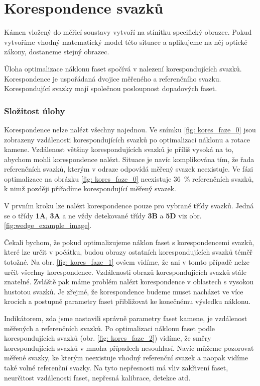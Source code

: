 \part{Korespondence svazků}

Kámen vložený do měřicí soustavy vytvoří na stínítku specifický obrazec. Pokud vytvoříme vhodný matematický model této situace a aplikujeme na něj optické zákony, dostaneme stejný obrazec. 

Úloha optimalizace náklonu faset spočívá v nalezení korespondujících svazků. Korespondence je uspořádaná dvojice měřeného a referenčního svazku. Korespondující svazky mají společnou posloupnost dopadových faset. 

\section{Složitost úlohy}
	Korespondence nelze nalézt všechny najednou. Ve snímku \ref{fig: kores_faze_0} jsou zobrazeny vzdálenosti korespondujících svazků po optimalizaci náklonu a rotace kamene. Vzdálenost většiny korespondujících svazků je příliš vysoká na to, abychom mohli korespondence nalézt. Situace je navíc komplikována tím, že řada referenčních svazků, kterým v odraze odpovídá měřený svazek neexistuje. Ve fázi optimalizace na obrázku \ref{fig: kores_faze_0} neexistuje \SI{36}{\percent} referenčních svazků, k nimž později přiřadíme korespondující měřený svazek. 
	
	  V prvním kroku lze nalézt korespondence pouze pro vybrané třídy svazků. Jedná se o třídy \textbf{1A}, \textbf{3A} a ne vždy detekované třídy \textbf{3B} a \textbf{5D} viz obr. \ref{fig:wedge_example_image}. 
	
	Čekali bychom, že pokud optimalizujeme náklon faset s korespondencemi svazků, které lze určit v počátku, budou obrazy ostatních korespondujících svazků téměř totožné. Na obr. \ref{fig: kores_faze_1} ovšem vidíme, že ani v tomto případě nelze určit všechny korespondence. Vzdálenosti obrazů korespondujících svazků stále znatelné. Zvláště pak máme problém nalézt korespondence v oblastech s vysokou hustotou svazků. Je zřejmé, že korespondence budeme muset nacházet ve více krocích a postupně parametry faset přibližovat ke konečnému výsledku náklonu. 

Indikátorem, zda jsme nastavili správně parametry faset kamene, je vzdálenost měřených a referenčních svazků. Po optimalizaci náklonu faset podle korespondujících svazků (obr. \ref{fig: kores_faze_2}) vidíme, že směry korespondujících svazků v mnoha případech nesouhlasí. Navíc můžeme pozorovat měřené svazky, ke kterým neexistuje vhodný referenční svazek a naopak vidíme také volné referenční svazky. Na tyto nepřesnosti má vliv zakřivení faset, neurčitost vzdálenosti faset, nepřesná kalibrace, detekce atd.  

